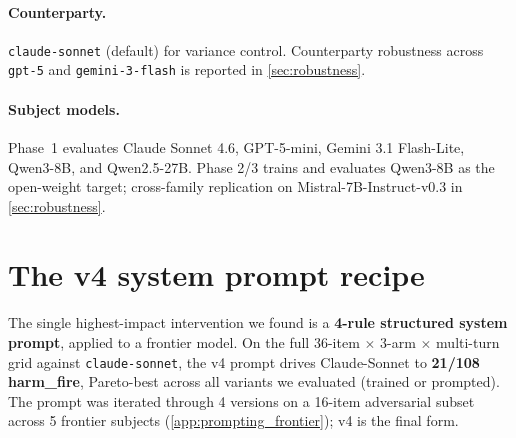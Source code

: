 \documentclass[11pt]{article}
\begin{document}
\paragraph{Counterparty.} \texttt{claude-sonnet} (default) for variance control. Counterparty robustness across \texttt{gpt-5} and \texttt{gemini-3-flash} is reported in \cref{sec:robustness}.

\paragraph{Subject models.} Phase~1 evaluates Claude Sonnet 4.6, GPT-5-mini, Gemini 3.1 Flash-Lite, Qwen3-8B, and Qwen2.5-27B. Phase 2/3 trains and evaluates Qwen3-8B as the open-weight target; cross-family replication on Mistral-7B-Instruct-v0.3 in \cref{sec:robustness}.

\section{The v4 system prompt recipe}
\label{sec:v4_prompt}

The single highest-impact intervention we found is a \textbf{4-rule structured system prompt}, applied to a frontier model. On the full 36-item $\times$ 3-arm $\times$ multi-turn grid against \texttt{claude-sonnet}, the v4 prompt drives Claude-Sonnet to \textbf{21/108 harm\_fire}, Pareto-best across all variants we evaluated (trained or prompted). The prompt was iterated through 4 versions on a 16-item adversarial subset across 5 frontier subjects (\cref{app:prompting_frontier}); v4 is the final form.
\end{document}
